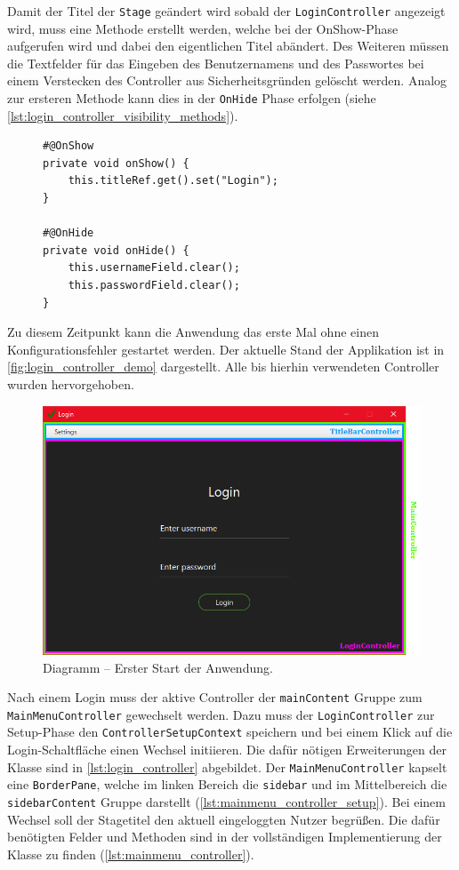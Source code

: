 \noindent Damit der Titel der \texttt{Stage} geändert wird sobald der \texttt{LoginController} angezeigt wird, muss eine Methode erstellt werden, welche bei der OnShow-Phase aufgerufen wird und dabei den eigentlichen Titel abändert. Des Weiteren müssen die Textfelder für das Eingeben des Benutzernamens und des Passwortes bei einem Verstecken des Controller aus Sicherheitsgründen gelöscht werden. Analog zur ersteren Methode kann dies in der \texttt{OnHide} Phase erfolgen (siehe \autoref{lst:login_controller_visibility_methods}).
\begin{figure}[H]
	\begin{lstlisting}[caption=Demo -- OnShow und OnHide Methoden, captionpos=b, label=lst:login_controller_visibility_methods]
#@OnShow
private void onShow() {
    this.titleRef.get().set("Login");
}

#@OnHide
private void onHide() {
    this.usernameField.clear();
    this.passwordField.clear();
}
	\end{lstlisting}
\end{figure}
\noindent Zu diesem Zeitpunkt kann die Anwendung das erste Mal ohne einen Konfigurationsfehler gestartet werden. Der aktuelle Stand der Applikation ist in \autoref{fig:login_controller_demo} dargestellt. Alle bis hierhin verwendeten Controller wurden hervorgehoben.
\begin{figure}[H]
	\centering
	\includegraphics[width=\textwidth]{Abbildungen/Login Screen.png}
	\caption{Diagramm -- Erster Start der Anwendung.}
	\label{fig:login_controller_demo}
\end{figure}
\noindent Nach einem Login muss der aktive Controller der \texttt{mainContent} Gruppe zum \texttt{MainMenuController} gewechselt werden. Dazu muss der \texttt{LoginController} zur Setup-Phase den \texttt{ControllerSetupContext} speichern und bei einem Klick auf die Login-Schaltfläche einen Wechsel initiieren. Die dafür nötigen Erweiterungen der Klasse sind in \autoref{lst:login_controller} abgebildet. Der \texttt{MainMenuController} kapselt eine \texttt{BorderPane}, welche im linken Bereich die \texttt{sidebar} und im Mittelbereich die \texttt{sidebarContent} Gruppe darstellt (\autoref{lst:mainmenu_controller_setup}). Bei einem Wechsel soll der Stagetitel den aktuell eingeloggten Nutzer begrüßen. Die dafür benötigten Felder und Methoden sind in der vollständigen Implementierung der Klasse zu finden (\autoref{lst:mainmenu_controller}).
